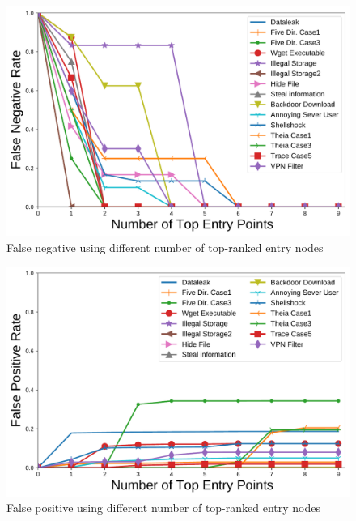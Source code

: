 % 
% 

\begin{figure}[t]
    \centering
    \includegraphics[width=\linewidth]{figs/falsenegative.pdf}
    \caption{False negative using different number of top-ranked entry nodes}
    \label{fig:rq2faslenegative}
\end{figure}
\begin{figure}[t]
    \centering
    \includegraphics[width=\linewidth]{figs/falsepositive.pdf}
    \caption{False positive using different number of top-ranked entry nodes}
    \label{fig:rq2flasepositive}
\end{figure}

